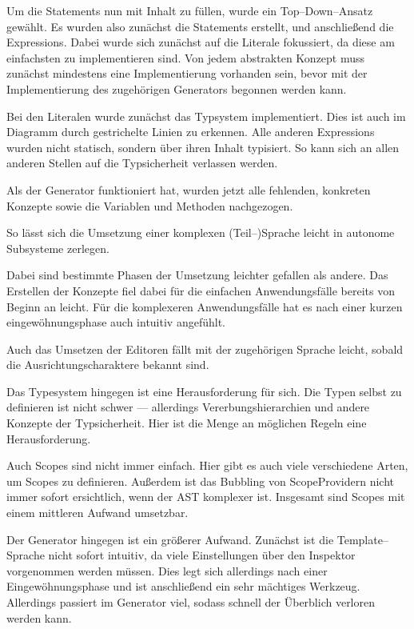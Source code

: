 Um die Statements nun mit Inhalt zu füllen, wurde ein Top--Down--Ansatz gewählt.
Es wurden also zunächst die Statements erstellt, und anschließend die Expressions.
Dabei wurde sich zunächst auf die Literale fokussiert, da diese am einfachsten zu implementieren sind.
Von jedem abstrakten Konzept muss zunächst mindestens eine Implementierung vorhanden sein, bevor mit der Implementierung des zugehörigen Generators begonnen werden kann.

Bei den Literalen wurde zunächst das Typsystem implementiert.
Dies ist auch im Diagramm durch gestrichelte Linien zu erkennen.
Alle anderen Expressions wurden nicht statisch, sondern über ihren Inhalt typisiert.
So kann sich an allen anderen Stellen auf die Typsicherheit verlassen werden.

Als der Generator funktioniert hat, wurden jetzt alle fehlenden, konkreten Konzepte sowie die Variablen und Methoden nachgezogen.

So lässt sich die Umsetzung einer komplexen (Teil--)Sprache leicht in autonome Subsysteme zerlegen.

Dabei sind bestimmte Phasen der Umsetzung leichter gefallen als andere.
Das Erstellen der Konzepte fiel dabei für die einfachen Anwendungsfälle bereits von Beginn an leicht.
Für die komplexeren Anwendungsfälle hat es nach einer kurzen eingewöhnungsphase auch intuitiv angefühlt.

Auch das Umsetzen der Editoren fällt mit der zugehörigen Sprache leicht, sobald die Ausrichtungscharaktere bekannt sind.

Das Typesystem hingegen ist eine Herausforderung für sich.
Die Typen selbst zu definieren ist nicht schwer --- allerdings Vererbungshierarchien und andere Konzepte der Typsicherheit.
Hier ist die Menge an möglichen Regeln eine Herausforderung.

Auch Scopes sind nicht immer einfach.
Hier gibt es auch viele verschiedene Arten, um Scopes zu definieren.
Außerdem ist das Bubbling von {\ttfamily ScopeProvider}n nicht immer sofort ersichtlich, wenn der \ac{AST} komplexer ist.
Insgesamt sind Scopes mit einem mittleren Aufwand umsetzbar.

Der Generator hingegen ist ein größerer Aufwand.
Zunächst ist die Template--Sprache nicht sofort intuitiv, da viele Einstellungen über den Inspektor vorgenommen werden müssen.
Dies legt sich allerdings nach einer Eingewöhnungsphase und ist anschließend ein sehr mächtiges Werkzeug.
Allerdings passiert im Generator viel, sodass schnell der Überblich verloren werden kann.

